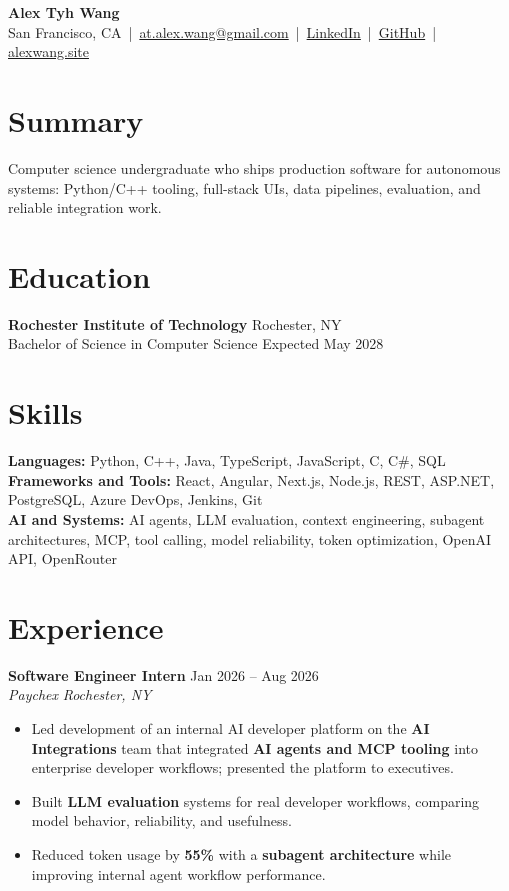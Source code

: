 \documentclass[10pt,letterpaper]{article}
\newif\ifresumeFirstRole
\newcommand{\resumeRole}[4]{%
  \ifresumeFirstRole
    \global\resumeFirstRolefalse
  \else
    \vspace{0pt plus 1fill}%
  \fi
  \textbf{#1} \hfill #2\\
  \textit{#3} \hfill \textit{#4}
}
\begin{document}
\begin{center}
{\Large \textbf{Alex Tyh Wang}}\\
San Francisco, CA \,|\, \href{mailto:at.alex.wang@gmail.com}{at.alex.wang@gmail.com} \,|\, \href{https://www.linkedin.com/in/alex-tyh-wang/}{LinkedIn} \,|\, \href{https://github.com/alextyhwang}{GitHub} \,|\, \href{https://alexwang.site}{alexwang.site}
\end{center}

\section*{Summary}
Computer science undergraduate who ships production software for autonomous systems: Python/C++ tooling, full-stack UIs, data pipelines, evaluation, and reliable integration work.

\section*{Education}
\textbf{Rochester Institute of Technology} \hfill Rochester, NY\\
Bachelor of Science in Computer Science \hfill Expected May 2028

\section*{Skills}
\textbf{Languages:} Python, C++, Java, TypeScript, JavaScript, C, C\#, SQL\\
\textbf{Frameworks and Tools:} React, Angular, Next.js, Node.js, REST, ASP.NET, PostgreSQL, Azure DevOps, Jenkins, Git\\
\textbf{AI and Systems:} AI agents, LLM evaluation, context engineering, subagent architectures, MCP, tool calling, model reliability, token optimization, OpenAI API, OpenRouter

\section*{Experience}
\resumeRole{Software Engineer Intern}{Jan 2026 -- Aug 2026}{Paychex}{Rochester, NY}
\begin{itemize}
  \item Led development of an internal AI developer platform on the \textbf{AI Integrations} team that integrated \textbf{AI agents and MCP tooling} into enterprise developer workflows; presented the platform to executives.
  \item Built \textbf{LLM evaluation} systems for real developer workflows, comparing model behavior, reliability, and usefulness.
  \item Reduced token usage by \textbf{55\%} with a \textbf{subagent architecture} while improving internal agent workflow performance.
\end{itemize}
\end{document}
